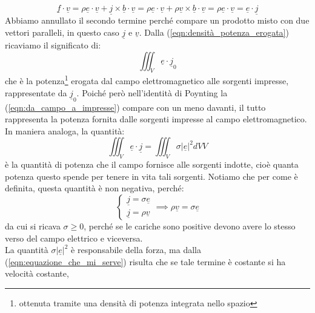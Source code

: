 \documentclass{book}
\begin{document}
        \begin{equation}
            \label{eqn:densità_potenza_erogata}
            \underline{f} \cdot \underline{v} = \rho \underline{e} \cdot \underline{v}+\underline{j}\times \underline{b}\cdot \underline{v} = 
            \rho \underline{e} \cdot \underline{v}+\rho \underline{v}\times \underline{b}\cdot \underline{v} = \rho \underline{e} \cdot \underline{v} = \underline{e} \cdot \underline{j}
        \end{equation}
        Abbiamo annullato il secondo termine perché compare un prodotto misto con due vettori paralleli, in questo caso $\underline{j}$ e $\underline{v}$.
        Dalla (\ref{eqn:densità_potenza_erogata}) ricaviamo il significato di:
        \begin{equation}
            \label{eqn:da_campo_a_impresse}
            \iiint_{V} \underline{e} \cdot \underline{j}_{0}
        \end{equation}
        che è la potenza\footnote{ottenuta tramite una densità di potenza integrata nello spazio} erogata dal campo elettromagnetico alle sorgenti impresse, rappresentate da $\underline{j}_{0}$.
        Poiché però nell'identità di Poynting la (\ref{eqn:da_campo_a_impresse}) compare con un meno davanti, il tutto rappresenta la potenza fornita dalle sorgenti impresse al campo elettromagnetico.
        \\ In maniera analoga, la quantità:
        \begin{equation}
            \iiint_{V} \underline{e} \cdot \underline{j} = \iiint_{V} \sigma |\underline{e}|^{2}dVV
        \end{equation}
        è la quantità di potenza che il campo fornisce alle sorgenti indotte, cioè quanta potenza questo spende per tenere in vita tali sorgenti. Notiamo che
        per come è definita, questa quantità è non negativa, perché:
        \begin{equation}
            \label{eqn:equazione_che_mi_serve}
            \begin{cases}
                \underline{j} = \sigma \underline{e} \\
                \underline{j}=\rho \underline{v}
            \end{cases} \implies \rho \underline{v} = \sigma \underline{e}
        \end{equation}
        da cui si ricava $\sigma \geq 0$, perché se le cariche sono positive devono avere lo stesso verso del campo elettrico e viceversa. \\
        La quantità $\sigma |\underline{e}|^{2}$ è responsabile della forza, ma dalla (\ref{eqn:equazione_che_mi_serve}) risulta che se tale termine è costante si ha velocità costante,
\end{document}
